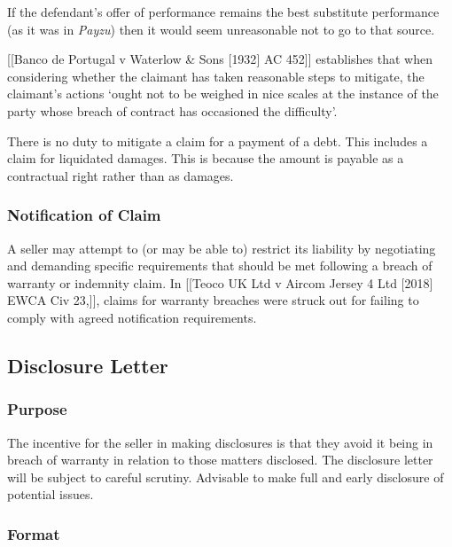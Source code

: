 \documentclass[
]{article}
\begin{document}
If the defendant's offer of performance remains the best substitute
performance (as it was in \emph{Payzu}) then it would seem unreasonable
not to go to that source.

{[}{[}Banco de Portugal v Waterlow \& Sons {[}1932{]} AC 452{]}{]}
establishes that when considering whether the claimant has taken
reasonable steps to mitigate, the claimant's actions `ought not to be
weighed in nice scales at the instance of the party whose breach of
contract has occasioned the difficulty'.

There is no duty to mitigate a claim for a payment of a debt. This
includes a claim for liquidated damages. This is because the amount is
payable as a contractual right rather than as damages.

\hypertarget{notification-of-claim}{%
\subsubsection{Notification of Claim}\label{notification-of-claim}}

A seller may attempt to (or may be able to) restrict its liability by
negotiating and demanding specific requirements that should be met
following a breach of warranty or indemnity claim. In {[}{[}Teoco UK Ltd
v Aircom Jersey 4 Ltd {[}2018{]} EWCA Civ 23,{]}{]}, claims for warranty
breaches were struck out for failing to comply with agreed notification
requirements.

\hypertarget{disclosure-letter}{%
\subsection{Disclosure Letter}\label{disclosure-letter}}

\hypertarget{purpose}{%
\subsubsection{Purpose}\label{purpose}}

The incentive for the seller in making disclosures is that they avoid it
being in breach of warranty in relation to those matters disclosed. The
disclosure letter will be subject to careful scrutiny. Advisable to make
full and early disclosure of potential issues.

\hypertarget{format}{%
\subsubsection{Format}\label{format}}
\end{document}
